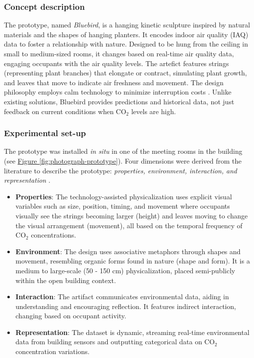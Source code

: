 \subsubsection{Concept description}

The prototype, named \textit{Bluebird}, is a hanging kinetic sculpture inspired by natural materials and the shapes of hanging planters. It encodes indoor air quality (IAQ) data to foster a relationship with nature. Designed to be hung from the ceiling in small to medium-sized rooms, it changes based on real-time air quality data, engaging occupants with the air quality levels. The artefict features strings (representing plant branches) that elongate or contract, simulating plant growth, and leaves that move to indicate air freshness and movement. The design philosophy employs calm technology to minimize interruption costs \cite{case_calm_2016}. Unlike existing solutions, Bluebird provides predictions and historical data, not just feedback on current conditions when CO$_{2}$ levels are high.

\subsubsection{Experimental set-up}

The prototype was installed \textit{in situ} in one of the meeting rooms in the building (see \hyperref[fig:photograph-prototype]{Figure \ref*{fig:photograph-prototype}}). Four dimensions were derived from the literature to describe the prototype: \textit{properties, environment, interaction, and representation} \cite{sauve_physecology_2022, hornecker_design_2023, anhalt_university_germany_design_2022}.

\begin{itemize}
  \item \textbf{Properties}: The technology-assisted physicalization uses explicit visual variables such as size, position, timing, and movement where occupants visually see the strings becoming larger (height) and leaves moving to change the visual arrangement (movement), all based on the temporal frequency of CO$_{2}$ concentrations.
  \item \textbf{Environment}: The design uses associative metaphors through shapes and movement, resembling organic forms found in nature (shape and form). It is a medium to large-scale (50 - 150 cm) physicalization, placed semi-publicly within the open building context.
  \item \textbf{Interaction}: The artifact communicates environmental data, aiding in understanding and encouraging reflection. It features indirect interaction, changing based on occupant activity.
  \item \textbf{Representation}: The dataset is dynamic, streaming real-time environmental data from building sensors and outputting categorical data on CO$_{2}$ concentration variations.
\end{itemize}

